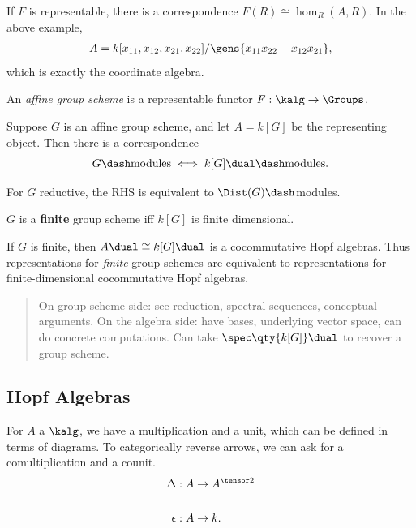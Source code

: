If \(F\) is representable, there is a correspondence
\(F(R) \cong \hom_R(A, R)\). In the above example,
\begin{align*}A = k[x_{11}, x_{12}, x_{21}, x_{22}] / \gens{x_{11} x_{22} - x_{12}x_{21}},\end{align*}
which is exactly the coordinate algebra.

\begin{definition}

An \emph{affine group scheme} is a representable functor
\(F:\kalg\to\Groups\).

\end{definition}

Suppose \(G\) is an affine group scheme, and let \(A = k[G]\) be the
representing object. Then there is a correspondence
\begin{align*}  
G\dash\text{modules} \iff k[G]\dual\dash\text{modules}
.\end{align*}

For \(G\) reductive, the RHS is equivalent to \(\Dist(G)\dash\)modules.

\begin{definition}

\(G\) is a \textbf{finite} group scheme iff \(k[G]\) is finite
dimensional.

\end{definition}

If \(G\) is finite, then \(A\dual \cong k[G]\dual\) is a cocommutative
Hopf algebras. Thus representations for \emph{finite} group schemes are
equivalent to representations for finite-dimensional cocommutative Hopf
algebras.

\begin{quote}
On group scheme side: see reduction, spectral sequences, conceptual
arguments. On the algebra side: have bases, underlying vector space, can
do concrete computations. Can take \(\spec \qty{k[G]}\dual\) to recover
a group scheme.
\end{quote}

\hypertarget{hopf-algebras}{%
\subsection{Hopf Algebras}\label{hopf-algebras}}

For \(A\) a \(\kalg\), we have a multiplication and a unit, which can be
defined in terms of diagrams. To categorically reverse arrows, we can
ask for a comultiplication and a counit.
\begin{align*}  
\Delta: A &\to A^{\tensor 2}
\\ \\
\epsilon: A &\to k 
.\end{align*}

